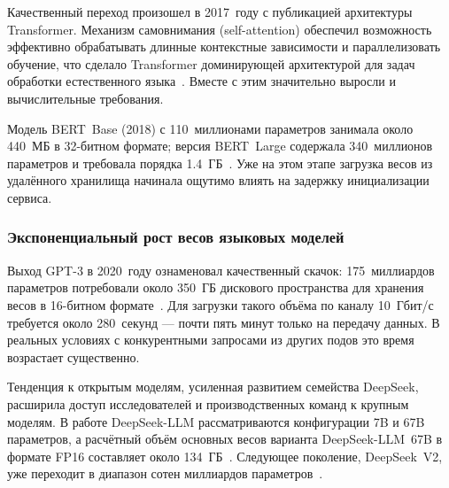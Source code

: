Качественный переход произошел в 2017~году с публикацией архитектуры Transformer. Механизм самовнимания (self-attention) обеспечил возможность эффективно обрабатывать длинные контекстные зависимости и параллелизовать обучение, что сделало Transformer доминирующей архитектурой для задач обработки естественного языка~\cite{bert2018}. Вместе с этим значительно выросли и вычислительные требования.

Модель BERT~Base (2018) с 110~миллионами параметров занимала около 440~МБ в 32-битном формате; версия BERT~Large содержала 340~миллионов параметров и требовала порядка 1.4~ГБ~\cite{bert2018}. Уже на этом этапе загрузка весов из удалённого хранилища начинала ощутимо влиять на задержку инициализации сервиса.

\subsubsection{Экспоненциальный рост весов языковых моделей}

Выход GPT-3 в 2020~году ознаменовал качественный скачок: 175~миллиардов параметров потребовали около 350~ГБ дискового пространства для хранения весов в 16-битном формате~\cite{gpt3_2020}. Для загрузки такого объёма по каналу 10~Гбит/с требуется около 280~секунд — почти пять минут только на передачу данных. В реальных условиях с конкурентными запросами из других подов это время возрастает существенно.

Тенденция к открытым моделям, усиленная развитием семейства DeepSeek, расширила доступ исследователей и производственных команд к крупным моделям. В работе DeepSeek-LLM рассматриваются конфигурации 7B и 67B параметров, а расчётный объём основных весов варианта DeepSeek-LLM~67B в формате FP16 составляет около 134~ГБ~\cite{deepseekllm_2024}. Следующее поколение, DeepSeek~V2, уже переходит в диапазон сотен миллиардов параметров~\cite{deepseekv2_2024}.

